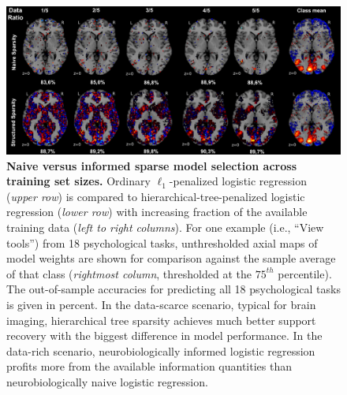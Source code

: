 \documentclass{article}
\begin{document}
\begin{figure}
\begin{centering}
\includegraphics[width=1.00\textwidth]{../figures/dataratio_trans.pdf}
\end{centering}
\vspace{-0.6cm}
\caption{\textbf{Naive versus informed sparse model selection
across training set sizes.}
Ordinary $\ell_1$-penalized logistic regression
(\textit{upper row})
is compared
to hierarchical-tree-penalized logistic regression
(\textit{lower row})
with increasing fraction
of the available training data (\textit{left to right columns}).
For one example (i.e., ``View tools'') from 18 psychological tasks,
unthresholded axial maps of model weights
are shown for comparison against
the sample average of that class
(\textit{rightmost column}, thresholded at the $75^{th}$ percentile).
The out-of-sample accuracies for predicting all 18 psychological tasks
is given in percent.
%
In the data-scarce scenario,
typical for brain imaging,
hierarchical tree sparsity achieves much
better support recovery with the biggest difference
in model performance.
%
In the data-rich scenario,
neurobiologically informed logistic regression
profits more from the available information quantities than
neurobiologically naive logistic regression.
}
\label{fig_dataratio}
\end{figure}
\end{document}

